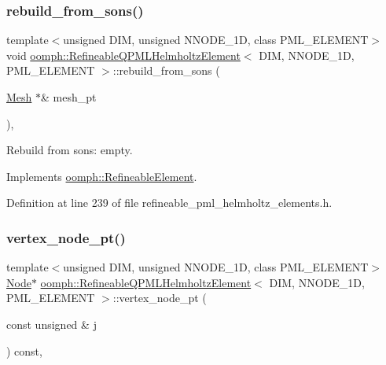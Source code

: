 \subsubsection{\texorpdfstring{rebuild\+\_\+from\+\_\+sons()}{rebuild\_from\_sons()}}
{\footnotesize\ttfamily template$<$unsigned D\+IM, unsigned N\+N\+O\+D\+E\+\_\+1D, class P\+M\+L\+\_\+\+E\+L\+E\+M\+E\+NT$>$ \\
void \hyperlink{classoomph_1_1RefineableQPMLHelmholtzElement}{oomph\+::\+Refineable\+Q\+P\+M\+L\+Helmholtz\+Element}$<$ D\+IM, N\+N\+O\+D\+E\+\_\+1D, P\+M\+L\+\_\+\+E\+L\+E\+M\+E\+NT $>$\+::rebuild\+\_\+from\+\_\+sons (\begin{DoxyParamCaption}\item[{\hyperlink{classoomph_1_1Mesh}{Mesh} $\ast$\&}]{mesh\+\_\+pt }\end{DoxyParamCaption})\hspace{0.3cm}{\ttfamily [inline]}, {\ttfamily [virtual]}}



Rebuild from sons\+: empty. 



Implements \hyperlink{classoomph_1_1RefineableElement_a33324be27833fa4b78279d17158215fa}{oomph\+::\+Refineable\+Element}.



Definition at line 239 of file refineable\+\_\+pml\+\_\+helmholtz\+\_\+elements.\+h.

\mbox{\label{classoomph_1_1RefineableQPMLHelmholtzElement_a267cb4f80eb5d48ac55dcc5b9f38dafe}} 
\subsubsection{\texorpdfstring{vertex\+\_\+node\+\_\+pt()}{vertex\_node\_pt()}}
{\footnotesize\ttfamily template$<$unsigned D\+IM, unsigned N\+N\+O\+D\+E\+\_\+1D, class P\+M\+L\+\_\+\+E\+L\+E\+M\+E\+NT$>$ \\
\hyperlink{classoomph_1_1Node}{Node}$\ast$ \hyperlink{classoomph_1_1RefineableQPMLHelmholtzElement}{oomph\+::\+Refineable\+Q\+P\+M\+L\+Helmholtz\+Element}$<$ D\+IM, N\+N\+O\+D\+E\+\_\+1D, P\+M\+L\+\_\+\+E\+L\+E\+M\+E\+NT $>$\+::vertex\+\_\+node\+\_\+pt (\begin{DoxyParamCaption}\item[{const unsigned \&}]{j }\end{DoxyParamCaption}) const\hspace{0.3cm}{\ttfamily [inline]}, {\ttfamily [virtual]}}



